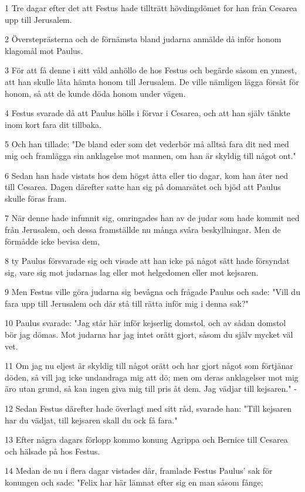 \par 1 Tre dagar efter det att Festus hade tillträtt hövdingdömet for han från Cesarea upp till Jerusalem.
\par 2 Översteprästerna och de förnämsta bland judarna anmälde då inför honom klagomål mot Paulus.
\par 3 För att få denne i sitt våld anhöllo de hos Festus och begärde såsom en ynnest, att han skulle låta hämta honom till Jerusalem. De ville nämligen lägga försåt för honom, så att de kunde döda honom under vägen.
\par 4 Festus svarade då att Paulus hölls i förvar i Cesarea, och att han själv tänkte inom kort fara dit tillbaka.
\par 5 Och han tillade: "De bland eder som det vederbör må alltså fara dit ned med mig och framlägga sin anklagelse mot mannen, om han är skyldig till något ont."
\par 6 Sedan han hade vistats hos dem högst åtta eller tio dagar, kom han åter ned till Cesarea. Dagen därefter satte han sig på domarsätet och bjöd att Paulus skulle föras fram.
\par 7 När denne hade infunnit sig, omringades han av de judar som hade kommit ned från Jerusalem, och dessa framställde nu många svåra beskyllningar. Men de förmådde icke bevisa dem,
\par 8 ty Paulus försvarade sig och visade att han icke på något sätt hade försyndat sig, vare sig mot judarnas lag eller mot helgedomen eller mot kejsaren.
\par 9 Men Festus ville göra judarna sig bevågna och frågade Paulus och sade: "Vill du fara upp till Jerusalem och där stå till rätta inför mig i denna sak?"
\par 10 Paulus svarade: "Jag står här inför kejserlig domstol, och av sådan domstol bör jag dömas. Mot judarna har jag intet orätt gjort, såsom du själv mycket väl vet.
\par 11 Om jag nu eljest är skyldig till något orätt och har gjort något som förtjänar döden, så vill jag icke undandraga mig att dö; men om deras anklagelser mot mig äro utan grund, så kan ingen giva mig till pris åt dem. Jag vädjar till kejsaren." -
\par 12 Sedan Festus därefter hade överlagt med sitt råd, svarade han: "Till kejsaren har du vädjat, till kejsaren skall du ock få fara."
\par 13 Efter några dagars förlopp kommo konung Agrippa och Bernice till Cesarea och hälsade på hos Festus.
\par 14 Medan de nu i flera dagar vistades där, framlade Festus Paulus' sak för konungen och sade: "Felix har här lämnat efter sig en man såsom fånge;
